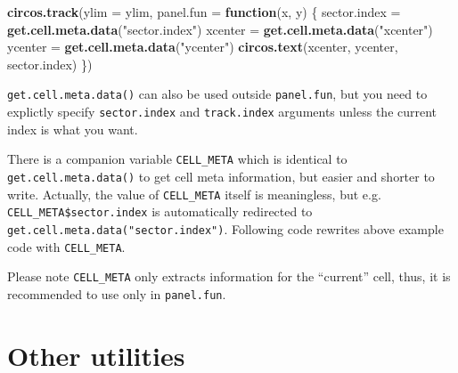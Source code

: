 \documentclass[]{book}
\newenvironment{Shaded}{\begin{snugshade}}{\end{snugshade}}
\newcommand{\KeywordTok}[1]{\textcolor[rgb]{0.13,0.29,0.53}{\textbf{#1}}}
\newcommand{\DataTypeTok}[1]{\textcolor[rgb]{0.13,0.29,0.53}{#1}}
\newcommand{\StringTok}[1]{\textcolor[rgb]{0.31,0.60,0.02}{#1}}
\newcommand{\ControlFlowTok}[1]{\textcolor[rgb]{0.13,0.29,0.53}{\textbf{#1}}}
\newcommand{\OperatorTok}[1]{\textcolor[rgb]{0.81,0.36,0.00}{\textbf{#1}}}
\newcommand{\NormalTok}[1]{#1}
\theoremstyle{definition}
\theoremstyle{definition}
\theoremstyle{remark}
\begin{document}
\begin{Shaded}
\begin{Highlighting}[]
\KeywordTok{circos.track}\NormalTok{(}\DataTypeTok{ylim =}\NormalTok{ ylim, }\DataTypeTok{panel.fun =} \ControlFlowTok{function}\NormalTok{(x, y) \{}
\NormalTok{    sector.index =}\StringTok{ }\KeywordTok{get.cell.meta.data}\NormalTok{(}\StringTok{"sector.index"}\NormalTok{)}
\NormalTok{    xcenter =}\StringTok{ }\KeywordTok{get.cell.meta.data}\NormalTok{(}\StringTok{"xcenter"}\NormalTok{)}
\NormalTok{    ycenter =}\StringTok{ }\KeywordTok{get.cell.meta.data}\NormalTok{(}\StringTok{"ycenter"}\NormalTok{)}
    \KeywordTok{circos.text}\NormalTok{(xcenter, ycenter, sector.index)}
\NormalTok{\})}
\end{Highlighting}
\end{Shaded}

\texttt{get.cell.meta.data()} can also be used outside
\texttt{panel.fun}, but you need to explictly specify
\texttt{sector.index} and \texttt{track.index} arguments unless the
current index is what you want.

There is a companion variable \texttt{CELL\_META} which is identical to
\texttt{get.cell.meta.data()} to get cell meta information, but easier
and shorter to write. Actually, the value of \texttt{CELL\_META} itself
is meaningless, but e.g. \texttt{CELL\_META\$sector.index} is
automatically redirected to \texttt{get.cell.meta.data("sector.index")}.
Following code rewrites above example code with \texttt{CELL\_META}.

\begin{Shaded}
\end{Shaded}

Please note \texttt{CELL\_META} only extracts information for the
``current'' cell, thus, it is recommended to use only in
\texttt{panel.fun}.

\section{Other utilities}\label{other-utilities}
\end{document}
